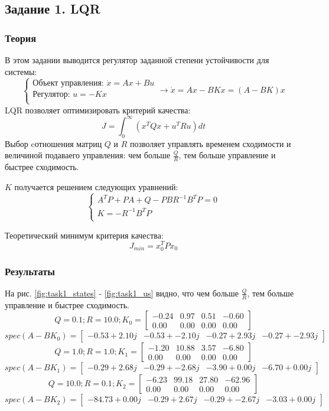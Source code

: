 \subsection{Задание 1. LQR}
\subsubsection{Теория}
В этом задании выводится регулятор заданной степени устойчивости для системы:
\[
        \begin{cases}
                \text{Объект управления: }\dot{x} = A x + Bu \\
                \text{Регулятор: }u = -K x \\
        \end{cases} \rightarrow
        \dot{x} = A x - BKx = (A-BK)x
\]
LQR позволяет оптимизировать критерий качества:
\[J = \int_0^\infty (x^T Q x + u^T R u)dt \]
Выбор cотношения матриц \(Q\) и \(R\) позволяет управлять временем сходимости и величиной подаваего управления: чем больше \(\frac{Q}{R}\), тем больше управление и быстрее сходимость.

\(K\) получается решением следующих уравнений:
\[
\begin{cases}
    A^T P + P A + Q - PBR^{-1}B^TP = 0\\
    K = -R^{-1} B^T P \\
\end{cases}
\]

Теоретический минимум критерия качества:
\[J_{min} = x_0^T P x_0\]

\subsubsection{Результаты}
На рис. \ref{fig:task1_states} - \ref{fig:task1_us} видно, что чем больше \(\frac{Q}{R}\), тем больше управление и быстрее сходимость.
\[Q = 0.1; R = 10.0; K_0 = \begin{bmatrix}
        -0.24 &  0.97 &  0.51 & -0.60\\
         0.00 &  0.00 &  0.00 &  0.00
       \end{bmatrix}\]
       \[spec(A-BK_0) = \begin{bmatrix}
        -0.53 + 2.10j & -0.53 + -2.10j & -0.27 + 2.93j & -0.27 + -2.93j
       \end{bmatrix}\]
\[Q = 1.0; R = 1.0; K_1 = \begin{bmatrix}
-1.20 &  10.88 &  3.57 & -6.80\\
        0.00 &  0.00 &  0.00 &  0.00
\end{bmatrix}\]
\[spec(A-BK_1) = \begin{bmatrix}
-0.29 + 2.68j & -0.29 + -2.68j & -3.90 + 0.00j & -6.70 + 0.00j
\end{bmatrix}\]
\[Q = 10.0; R = 0.1; K_2 = \begin{bmatrix}
        -6.23 &  99.18 &  27.80 & -62.96\\
         0.00 &  0.00 &  0.00 &  0.00
       \end{bmatrix}\]
       \[spec(A-BK_2) = \begin{bmatrix}
        -84.73 + 0.00j & -0.29 + 2.67j & -0.29 + -2.67j & -3.03 + 0.00j
       \end{bmatrix}\]

